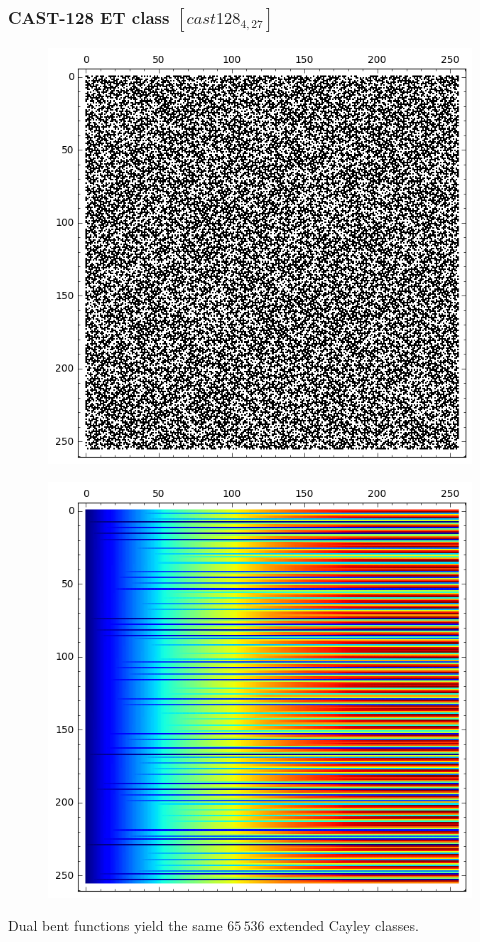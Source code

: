 \documentclass[pdf,sprung,slideColor,nocolorBG]{beamer}
\newenvironment{colortheme}[1]{
\def\ProvidesPackageRCS $##1${\relax}
\renewcommand{\ProcessOptions}{\relax}
\makeatletter

\makeatother
}{}
\begin{document}
\begin{colortheme}{jubata}
\begin{frame}
\frametitle{CAST-128 ET class $[cast128_{4,27}]$}
\begin{figure}
\centering
\begin{minipage}{.48\textwidth}
  \centering

\includegraphics[width=.9\linewidth]{../matrix_plot/cast128_4_27_weight_class_matrix.png}
  \label{fig:cast128_4_27_weight_class_matrix}
\end{minipage}
\begin{minipage}{.48\textwidth}
  \centering
\includegraphics[width=.9\linewidth]{../matrix_plot/cast128_4_27_bent_cayley_graph_index_matrix.png}
  \label{fig:cast128_4_27_bent_cayley_graph_index_matrix}
\end{minipage}%
\end{figure}
Dual bent functions yield the same $65\,536$ extended Cayley classes.
\end{frame}
\end{colortheme}
\end{document}
